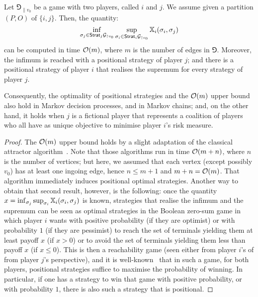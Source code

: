 \begin{lemma}\label{lm:secretlemma}
    Let $\Game_{\|v_0}$ be a game with two players, called $i$ and $j$.
    We assume given a partition $(P, O)$ of $\{i, j\}$.
    Then, the quantity:
    $$\inf_{\sigma_j \in \mathsf{Strat}_j\mathcal{G}_{\upharpoonright v_0}} \sup_{\sigma_i \in \mathsf{Strat}_i\mathcal{G}_{\upharpoonright v_0}} \mathbb{X}_i(\sigma_i, \sigma_j)$$
    can be computed in time $\mathcal{O}(m)$, where $m$ is the number of edges in $\Game$.
    Moreover, the infimum is reached with a positional strategy of player $j$; and there is a positional strategy of player $i$ that realises the supremum for every strategy of player $j$.

    Consequently, the optimality of positional strategies and the $\mathcal{O}(m)$ upper bound also hold in Markov decision processes, and in Markov chains; and, on the other hand, it holds when $j$ is a fictional player that represents a coalition of players who all have as unique objective to minimise player $i$'s risk measure.
\end{lemma}

\begin{proof}
    The $\mathcal{O}(m)$ upper bound holds by a slight adaptation of the classical attractor algorithm~\cite[Chapter~5.3]{AG11}.
    Note that those algorithms run in time $\mathcal{O}(m+n)$, where $n$ is the number of vertices; but here, we assumed that each vertex (except possibly $v_0$) has at least one ingoing edge, hence $n \leq m+1$ and $m+n = \mathcal{O}(m)$.
    That algorithm immediately induces positional optimal strategies.
    Another way to obtain that second result, however, is the following: once the quantity $x = \inf_{\sigma_j} \sup_{\sigma_i} \mathbb{X}_i(\sigma_i, \sigma_j)$ is known, strategies that realise the infimum and the supremum can be seen as optimal strategies in the Boolean zero-sum game in which player $i$ wants with positive probability (if they are optimist) or with probability $1$ (if they are pessimist) to reach the set of terminals yielding them at least payoff $x$ (if $x > 0$) or to avoid the set of terminals yielding them less than payoff $x$ (if $x \leq 0$).
    This is then a reachability game (seen either from player $i$'s of from player $j$'s perspective), and it is well-known~\cite[Chapter~5.3]{AG011} that in such a game, for both players, positional strategies suffice to maximise the probability of winning.
    In particular, if one has a strategy to win that game with positive probability, or with probability $1$, there is also such a strategy that is positional.
\end{proof}